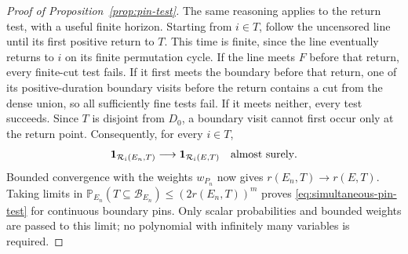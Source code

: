 \begin{proof}[Proof of Proposition~\ref{prop:pin-test}]
The same reasoning applies to the return test, with a useful finite
horizon.  Starting from $i\in T$, follow the uncensored line until
its first positive return to $T$.  This time is finite, since the
line eventually returns to $i$ on its finite permutation cycle.
If the line meets $F$ before that return, every finite-cut test fails.
If it first meets the boundary before that return, one of its
positive-duration boundary visits before the return contains a cut
from the dense union, so all sufficiently fine tests fail.  If it
meets neither, every test succeeds.  Since $T$ is disjoint from
$D_0$, a boundary visit cannot first occur only at the return point.
Consequently, for every $i\in T$,
\[
 \mathbf 1_{\mathcal R_i(E_n,T)}\longrightarrow
             \mathbf 1_{\mathcal R_i(E,T)}
             \quad\text{almost surely}.
\]
Bounded convergence with the weights $w_{P_n}$ now gives
$r(E_n,T)\to r(E,T)$.  Taking limits in
$\mathbb P_{E_n}(T\subseteq\mathcal B_{E_n})\le(2r(E_n,T))^m$
proves \eqref{eq:simultaneous-pin-test} for continuous boundary pins.
Only scalar probabilities and bounded weights are passed to this
limit; no polynomial with infinitely many variables is required.
\end{proof}
